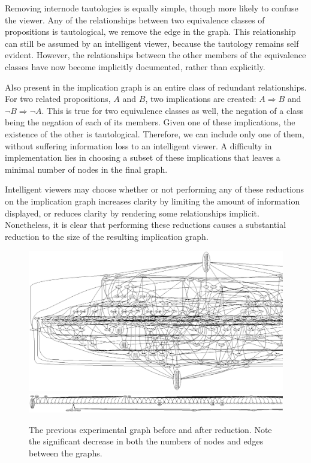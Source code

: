 \documentclass[11pt,twoside]{article}
\begin{document}
Removing internode tautologies is equally simple, though more likely to confuse the viewer. Any of the relationships between two equivalence classes of propositions is tautological, we remove the edge in the graph. This relationship can still be assumed by an intelligent viewer, because the tautology remains self evident. However, the relationships between the other members of the equivalence classes have now become implicitly documented, rather than explicitly.

Also present in the implication graph is an entire class of redundant relationships. For two related propositions, $A$ and $B$, two implications are created: $A \Rightarrow B$ and $\neg B \Rightarrow \neg A$. This is true for two equivalence classes as well, the negation of a class being the negation of each of its members. Given one of these implications, the existence of the other is tautological. Therefore, we can include only one of them, without suffering information loss to an intelligent viewer. A difficulty in implementation lies in choosing a subset of these implications that leaves a minimal number of nodes in the final graph.

Intelligent viewers may choose whether or not performing any of these reductions on the implication graph increases clarity by limiting the amount of information displayed, or reduces clarity by rendering some relationships implicit. Nonetheless, it is clear that performing these reductions causes a substantial reduction to the size of the resulting implication graph.

\begin{figure}
\includegraphics[scale=0.5]{div.ps}
\newline
\includegraphics[scale=0.5]{divreduced.ps}
\caption{The previous experimental graph before and after reduction. Note the significant decrease in both the numbers of nodes and edges between the graphs.}
\end{figure}
\end{document}
